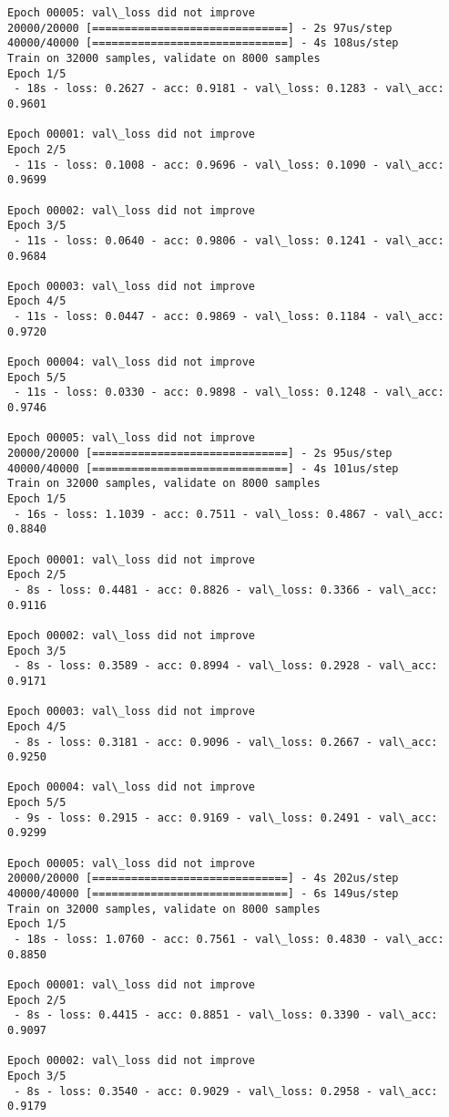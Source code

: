 \documentclass[11pt]{article}
\begin{document}
\begin{Verbatim}[commandchars=\\\{\}]
Epoch 00005: val\_loss did not improve
20000/20000 [==============================] - 2s 97us/step
40000/40000 [==============================] - 4s 108us/step
Train on 32000 samples, validate on 8000 samples
Epoch 1/5
 - 18s - loss: 0.2627 - acc: 0.9181 - val\_loss: 0.1283 - val\_acc: 0.9601

Epoch 00001: val\_loss did not improve
Epoch 2/5
 - 11s - loss: 0.1008 - acc: 0.9696 - val\_loss: 0.1090 - val\_acc: 0.9699

Epoch 00002: val\_loss did not improve
Epoch 3/5
 - 11s - loss: 0.0640 - acc: 0.9806 - val\_loss: 0.1241 - val\_acc: 0.9684

Epoch 00003: val\_loss did not improve
Epoch 4/5
 - 11s - loss: 0.0447 - acc: 0.9869 - val\_loss: 0.1184 - val\_acc: 0.9720

Epoch 00004: val\_loss did not improve
Epoch 5/5
 - 11s - loss: 0.0330 - acc: 0.9898 - val\_loss: 0.1248 - val\_acc: 0.9746

Epoch 00005: val\_loss did not improve
20000/20000 [==============================] - 2s 95us/step
40000/40000 [==============================] - 4s 101us/step
Train on 32000 samples, validate on 8000 samples
Epoch 1/5
 - 16s - loss: 1.1039 - acc: 0.7511 - val\_loss: 0.4867 - val\_acc: 0.8840

Epoch 00001: val\_loss did not improve
Epoch 2/5
 - 8s - loss: 0.4481 - acc: 0.8826 - val\_loss: 0.3366 - val\_acc: 0.9116

Epoch 00002: val\_loss did not improve
Epoch 3/5
 - 8s - loss: 0.3589 - acc: 0.8994 - val\_loss: 0.2928 - val\_acc: 0.9171

Epoch 00003: val\_loss did not improve
Epoch 4/5
 - 8s - loss: 0.3181 - acc: 0.9096 - val\_loss: 0.2667 - val\_acc: 0.9250

Epoch 00004: val\_loss did not improve
Epoch 5/5
 - 9s - loss: 0.2915 - acc: 0.9169 - val\_loss: 0.2491 - val\_acc: 0.9299

Epoch 00005: val\_loss did not improve
20000/20000 [==============================] - 4s 202us/step
40000/40000 [==============================] - 6s 149us/step
Train on 32000 samples, validate on 8000 samples
Epoch 1/5
 - 18s - loss: 1.0760 - acc: 0.7561 - val\_loss: 0.4830 - val\_acc: 0.8850

Epoch 00001: val\_loss did not improve
Epoch 2/5
 - 8s - loss: 0.4415 - acc: 0.8851 - val\_loss: 0.3390 - val\_acc: 0.9097

Epoch 00002: val\_loss did not improve
Epoch 3/5
 - 8s - loss: 0.3540 - acc: 0.9029 - val\_loss: 0.2958 - val\_acc: 0.9179


\end{Verbatim}
\end{document}
